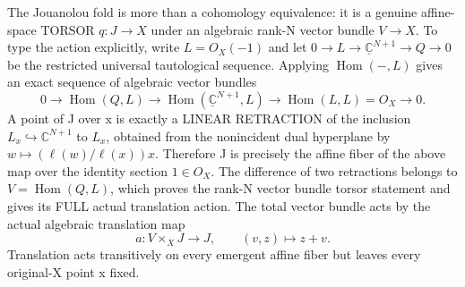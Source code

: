 \documentclass[11pt]{article}
\begin{document}
The Jouanolou fold is more than a
cohomology equivalence: it is a
genuine affine-space TORSOR
$q:J\to X$ under an algebraic rank-N
vector bundle $V\to X$.
To type the action explicitly, write
$L=O_X(-1)$ and let
$0\to L\to\underline{\mathbb C}^{N+1}
 \to Q\to0$ be the restricted
universal tautological sequence.
Applying $\operatorname{Hom}(-,L)$
gives an exact sequence of algebraic
vector bundles
\[
 0\to\operatorname{Hom}(Q,L)
  \to\operatorname{Hom}(
       \underline{\mathbb C}^{N+1},L)
  \to\operatorname{Hom}(L,L)=O_X
  \to0 .
\]
A point of J over x is exactly a
LINEAR RETRACTION of the inclusion
$L_x\hookrightarrow\mathbb C^{N+1}$
to $L_x$, obtained from the
nonincident dual hyperplane by
$w\mapsto(\ell(w)/\ell(x))x$.
Therefore J is precisely the affine
fiber of the above map over the
identity section $1\in O_X$.
The difference of two retractions
belongs to
$V=\operatorname{Hom}(Q,L)$,
which proves the rank-N vector
bundle torsor statement and gives
its FULL actual translation action.
The total vector bundle acts by
the actual algebraic translation map
\[
 a:V\times_X J\longrightarrow J,
 \qquad (v,z)\longmapsto z+v.                    \tag{10.1}
\]
Translation acts transitively on every
emergent affine fiber but leaves
every original-X point x fixed.
\end{document}
